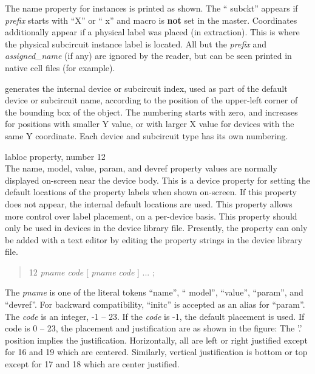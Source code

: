\begin{description}
The name property for instances is printed as shown.  The ``{\vt
subckt}'' appears if {\it prefix} starts with ``{\vt X}'' or ``{\vt
x}'' and {\et macro} is {\bf not} set in the master.  Coordinates
additionally appear if a physical label was placed (in extraction). 
This is where the physical subcircuit instance label is located.  All
but the {\it prefix} and {\it assigned\_name} (if any) are ignored by
the reader, but can be seen printed in native cell files (for example).

{\Xic} generates the internal device or subcircuit index, used as part
of the default device or subcircuit name, according to the position of
the upper-left corner of the bounding box of the object.  The
numbering starts with zero, and increases for positions with smaller Y
value, or with larger X value for devices with the same Y coordinate. 
Each device and subcircuit type has its own numbering.

\item{\et labloc} property, number 12\\
The {\et name}, {\et model}, {\et value}, {\et param}, and {\et
devref} property values are normally displayed on-screen near the
device body.  This is a device property for setting the default
locations of the property labels when shown on-screen.  If this
property does not appear, the internal default locations are used. 
This property allows more control over label placement, on a
per-device basis.  This property should only be used in devices in the
device library file.  Presently, the property can only be added with a
text editor by editing the property strings in the device library
file.

\begin{quote} 12 {\it pname code} [ {\it pname code\/} ] ... ;
\end{quote}

The {\it pname} is one of the literal tokens ``{\vt name}'', ``{\vt
model}'', ``{\vt value}'', ``{\vt param}'', and ``{\vt devref}''.  For
backward compatibility, ``{\vt initc}'' is accepted as an alias for
``{\vt param}''.  The {\it code} is an integer, -1 -- 23.  If the {\it
code} is -1, the default placement is used.  If code is 0 -- 23, the
placement and justification are as shown in the figure:  The '.'
position implies the justification.  Horizontally, all are left or
right justified except for 16 and 19 which are centered.  Similarly,
vertical justification is bottom or top except for 17 and 18 which are
center justified.


\end{description}
